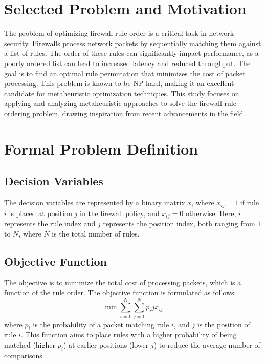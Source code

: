 \documentclass[12pt,a4paper]{article}
\begin{document}
\section{Selected Problem and Motivation}
The problem of optimizing firewall rule order is a critical task in network security. Firewalls process network packets by sequentially matching them against a list of rules. The order of these rules can significantly impact performance, as a poorly ordered list can lead to increased latency and reduced throughput. The goal is to find an optimal rule permutation that minimizes the cost of packet processing. This problem is known to be NP-hard, making it an excellent candidate for metaheuristic optimization techniques. This study focuses on applying and analyzing metaheuristic approaches to solve the firewall rule ordering problem, drawing inspiration from recent advancements in the field \citep{coscia2023innovative}.

\section{Formal Problem Definition}

\subsection{Decision Variables}
The decision variables are represented by a binary matrix $x$, where $x_{ij} = 1$ if rule $i$ is placed at position $j$ in the firewall policy, and $x_{ij} = 0$ otherwise. Here, $i$ represents the rule index and $j$ represents the position index, both ranging from $1$ to $N$, where $N$ is the total number of rules.
\subsection{Objective Function}
The objective is to minimize the total cost of processing packets, which is a function of the rule order. The objective function is formulated as follows:
\begin{equation}
\min \sum_{i=1}^{N} \sum_{j=1}^{N} p_i j x_{ij}
\end{equation}
where $p_i$ is the probability of a packet matching rule $i$, and $j$ is the position of rule $i$. This function aims to place rules with a higher probability of being matched (higher $p_i$) at earlier positions (lower $j$) to reduce the average number of comparisons.
\end{document}
